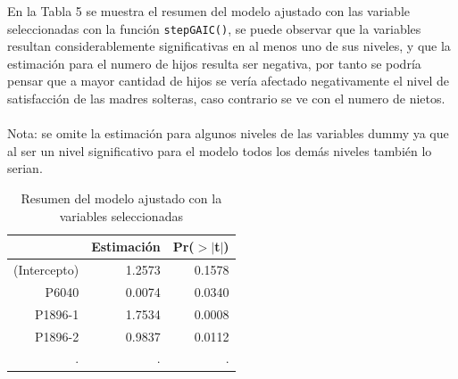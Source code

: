 \documentclass[11pt,twoside]{article}
\begin{document}
\noindent
En la Tabla 5 se muestra el resumen del modelo ajustado con las variable seleccionadas con la función \texttt{stepGAIC()}, se puede observar que la variables resultan considerablemente significativas en al menos uno de sus niveles, y que la estimación para el numero de hijos resulta ser negativa, por tanto se podría pensar que a mayor cantidad de hijos se vería afectado negativamente el nivel de satisfacción de las madres solteras, caso contrario se ve con el numero de nietos. 
\\
\\
Nota: se omite la estimación para algunos niveles de las variables dummy ya que al ser un nivel significativo para el modelo todos los demás niveles también lo serian.  

\begin{table}[H]
	\caption{\small{Resumen del modelo ajustado con la variables seleccionadas}}
	\centering
	\begin{tabular}{rrr}
		\hline
		& Estimación & Pr($>$$|$t$|$) \\ 
		\hline
		(Intercepto) & 1.2573 & 0.1578 \\ 
		P6040 & 0.0074 &  0.0340 \\ 
		P1896-1 & 1.7534 &  0.0008 \\ 
		P1896-2 & 0.9837 &  0.0112 \\ 
		. & . &  . \\ 
		

\end{tabular}
\end{table}
\end{document}
